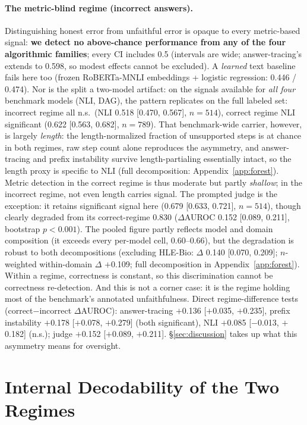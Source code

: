 \documentclass{article}
\begin{document}
\paragraph{The metric-blind regime (incorrect answers).} Distinguishing honest error from unfaithful error is opaque to every metric-based signal: \textbf{we detect no above-chance performance from any of the four algorithmic families}; every CI includes 0.5 (intervals are wide; answer-tracing's extends to 0.598, so modest effects cannot be excluded). A \emph{learned} text baseline fails here too (frozen RoBERTa-MNLI embeddings + logistic regression: 0.446 / 0.474). Nor is the split a two-model artifact: on the signals available for \emph{all four} benchmark models (NLI, DAG), the pattern replicates on the full labeled set: incorrect regime all n.s.\ (NLI 0.518 [0.470, 0.567], $n{=}514$), correct regime NLI significant (0.622 [0.563, 0.682], $n{=}789$). That benchmark-wide carrier, however, is largely \emph{length}: the length-normalized fraction of unsupported steps is at chance in both regimes, raw step count alone reproduces the asymmetry, and answer-tracing and prefix instability survive length-partialing essentially intact, so the length proxy is specific to NLI (full decomposition: Appendix~\ref{app:forest}). Metric detection in the correct regime is thus moderate but partly \emph{shallow}; in the incorrect regime, not even length carries signal. The prompted judge is the exception: it retains significant signal here (0.679 [0.633, 0.721], $n{=}514$), though clearly degraded from its correct-regime 0.830 ($\Delta$AUROC 0.152 [0.089, 0.211], bootstrap $p{<}0.001$). The pooled figure partly reflects model and domain composition (it exceeds every per-model cell, 0.60--0.66), but the degradation is robust to both decompositions (excluding HLE-Bio: $\Delta$ 0.140 [0.070, 0.209]; $n$-weighted within-domain $\Delta$ $+$0.109; full decomposition in Appendix~\ref{app:forest}). Within a regime, correctness is constant, so this discrimination cannot be correctness re-detection. And this is not a corner case: it is the regime holding most of the benchmark's annotated unfaithfulness. Direct regime-difference tests (correct$-$incorrect $\Delta$AUROC): answer-tracing $+$0.136 [$+$0.035, $+$0.235], prefix instability $+$0.178 [$+$0.078, $+$0.279] (both significant), NLI $+$0.085 [$-$0.013, $+$0.182] (n.s.); judge $+$0.152 [$+$0.089, $+$0.211]. \S\ref{sec:discussion} takes up what this asymmetry means for oversight.

\section{Internal Decodability of the Two Regimes}
\label{sec:internals}
\end{document}
